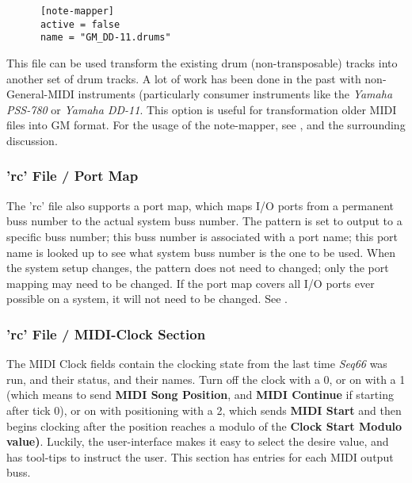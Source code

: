    \begin{verbatim}
      [note-mapper]
      active = false
      name = "GM_DD-11.drums"
   \end{verbatim}

   This file can be used transform the existing drum (non-transposable) tracks
   into another set of drum tracks.  A lot of work has been done in the past
   with non-General-MIDI instruments (particularly consumer instruments like the
   \textsl{Yamaha PSS-780} or \textsl{Yamaha DD-11}.
   This option is useful for transformation older MIDI files into GM format.
   For the usage of the note-mapper, see
   , and the surrounding
   discussion.

\subsubsection{'rc' File / Port Map}
\label{subsubsec:configuration_rc_port_map}

   The 'rc' file also supports a port map, which maps I/O ports from a
   permanent buss number to the actual system buss number.
   The pattern is set to output to a specific buss number; this buss number is
   associated with a port name; this port name is looked up to see what
   system buss number is the one to be used.  When the system setup changes,
   the pattern does not need to changed; only the port mapping may need to be
   changed.  If the port map covers all I/O ports ever possible on a system, it
   will not need to be changed.  See .

\subsubsection{'rc' File / MIDI-Clock Section}
\label{subsec:configuration_rc_midi_clock}

   The MIDI Clock fields contain the clocking state from the last 
   time \textsl{Seq66} was run, and their status, and their names.
   Turn off the clock with a 0, or on
   with a 1 (which means to send
   \textbf{MIDI Song Position}, and
   \textbf{MIDI Continue} if
   starting after tick 0), or on with positioning with a 2, which sends
   \textbf{MIDI Start}
   and then begins clocking after the position reaches a modulo of the
   \textbf{Clock Start Modulo value)}.  Luckily, the user-interface makes it
   easy to select the desire value, and has tool-tips to instruct the user.
   This section has entries for each MIDI output buss.

